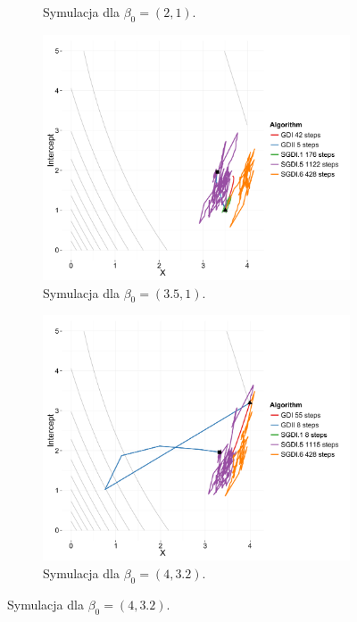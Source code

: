 \begin{figure}[h!]
\begin{center}
\begin{subfigure}[h!]{0.45\textwidth}
        \caption{Symulacja dla $\beta_0 = (2,1)$.}
      \end{subfigure}
   \begin{subfigure}[h!]{0.45\textwidth}
           \includegraphics[width=\textwidth]{Obrazki/contour_35_1.pdf}
           \caption{Symulacja dla $\beta_0 = (3.5,1)$.}
                 \end{subfigure}
   \begin{subfigure}[h!]{0.45\textwidth}
              \includegraphics[width=\textwidth]{Obrazki/contour_4_32.pdf}
              \caption{Symulacja dla $\beta_0 = (4,3.2)$.}

\end{subfigure}
\end{center}
\end{figure}
